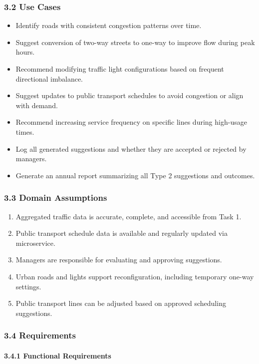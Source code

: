 \subsubsection*{3.2 Use Cases}

\begin{itemize}
    \item Identify roads with consistent congestion patterns over time.
    \item Suggest conversion of two-way streets to one-way to improve flow during peak hours.
    \item Recommend modifying traffic light configurations based on frequent directional imbalance.
    \item Suggest updates to public transport schedules to avoid congestion or align with demand.
    \item Recommend increasing service frequency on specific lines during high-usage times.
    \item Log all generated suggestions and whether they are accepted or rejected by managers.
    \item Generate an annual report summarizing all Type 2 suggestions and outcomes.
\end{itemize}

\subsubsection*{3.3 Domain Assumptions}

\begin{enumerate}
    \item Aggregated traffic data is accurate, complete, and accessible from Task 1.
    \item Public transport schedule data is available and regularly updated via microservice.
    \item Managers are responsible for evaluating and approving suggestions.
    \item Urban roads and lights support reconfiguration, including temporary one-way settings.
    \item Public transport lines can be adjusted based on approved scheduling suggestions.
\end{enumerate}

\subsubsection*{3.4 Requirements}

\paragraph{3.4.1 Functional Requirements}

